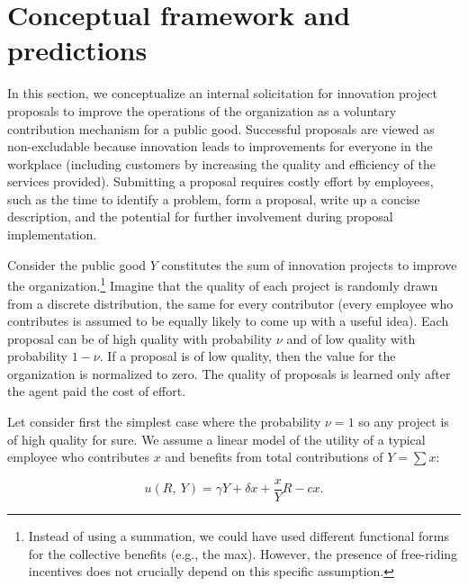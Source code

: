 \documentclass[11pt, titlepage]{article}
\begin{document}
\section{Conceptual framework and
predictions}\label{conceptual-framework-and-predictions}

In this section, we conceptualize an internal solicitation for
innovation project proposals to improve the operations of the
organization as a voluntary contribution mechanism for a public good.
Successful proposals are viewed as non-excludable because innovation
leads to improvements for everyone in the workplace (including customers
by increasing the quality and efficiency of the services provided).
Submitting a proposal requires costly effort by employees, such as the
time to identify a problem, form a proposal, write up a concise
description, and the potential for further involvement during proposal
implementation.

Consider the public good \(Y\) constitutes the sum of innovation
projects to improve the organization.\footnote{Instead of using a
  summation, we could have used different functional forms for the
  collective benefits (e.g., the max). However, the presence of
  free-riding incentives does not crucially depend on this specific
  assumption.} Imagine that the quality of each project is randomly
drawn from a discrete distribution, the same for every contributor
(every employee who contributes is assumed to be equally likely to come
up with a useful idea). Each proposal can be of high quality with
probability \(\nu\) and of low quality with probability \(1-\nu\). If a
proposal is of low quality, then the value for the organization is
normalized to zero. The quality of proposals is learned only after the
agent paid the cost of effort.

Let consider first the simplest case where the probability \(\nu=1\) so
any project is of high quality for sure. We assume a linear model of the
utility of a typical employee who contributes \(x\) and benefits from
total contributions of \(Y=\sum x\):

\begin{equation}\label{eq:utility}
  u(R,~ Y) =  \gamma Y + \delta x + \frac{x}{Y} R - c x.
\end{equation}
\end{document}
